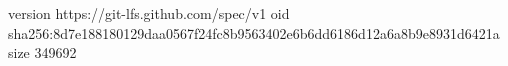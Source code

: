 version https://git-lfs.github.com/spec/v1
oid sha256:8d7e188180129daa0567f24fc8b9563402e6b6dd6186d12a6a8b9e8931d6421a
size 349692
